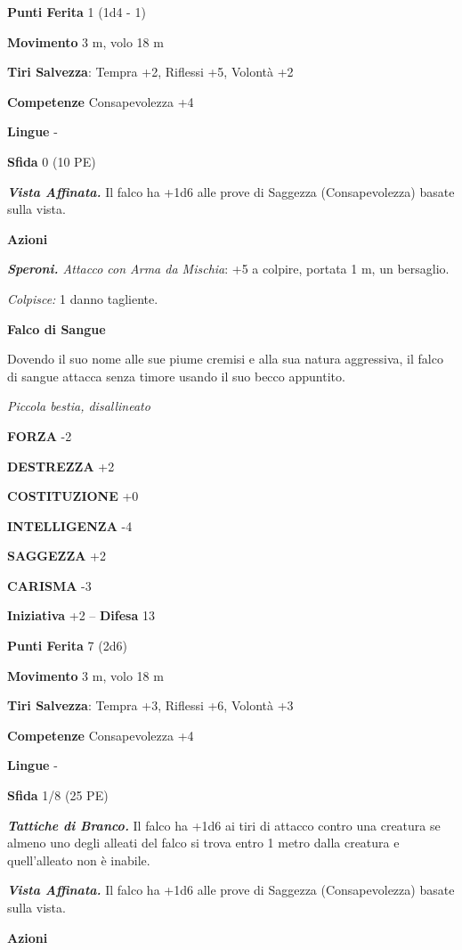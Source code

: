 \begin{multicols}{2}
\textbf{Punti Ferita} 1 (1d4 - 1)

\textbf{Movimento} 3 m, volo 18 m

\textbf{Tiri Salvezza}: Tempra +2, Riflessi +5, Volontà +2 

\textbf{Competenze} Consapevolezza +4

\textbf{Lingue} -

\textbf{Sfida} 0 (10 PE)

\emph{\textbf{Vista Affinata.}} Il falco ha +1d6 alle prove di Saggezza (Consapevolezza) basate sulla vista.

\textbf{Azioni}

\emph{\textbf{Speroni.} Attacco con Arma da Mischia}: +5 a colpire, portata 1 m, un bersaglio.

\emph{Colpisce:} 1 danno tagliente.

\medskip\textbf{Falco di Sangue}

Dovendo il suo nome alle sue piume cremisi e alla sua natura aggressiva, il falco di sangue attacca senza timore usando il suo becco appuntito.

\emph{Piccola bestia, disallineato}

\textbf{FORZA} -2

\textbf{DESTREZZA} +2

\textbf{COSTITUZIONE} +0

\textbf{INTELLIGENZA} -4

\textbf{SAGGEZZA} +2

\textbf{CARISMA} -3

\textbf{Iniziativa} +2 -- \textbf{Difesa} 13

\textbf{Punti Ferita} 7 (2d6)

\textbf{Movimento} 3 m, volo 18 m

\textbf{Tiri Salvezza}: Tempra +3, Riflessi +6, Volontà +3 

\textbf{Competenze} Consapevolezza +4

\textbf{Lingue} -

\textbf{Sfida} 1/8 (25 PE)

\emph{\textbf{Tattiche di Branco.}} Il falco ha +1d6 ai tiri di attacco contro una creatura se almeno uno degli alleati del falco si trova entro 1 metro dalla creatura e quell'alleato non è inabile.

\emph{\textbf{Vista Affinata.}} Il falco ha +1d6 alle prove di Saggezza (Consapevolezza) basate sulla vista.

\textbf{Azioni}


\end{multicols}
